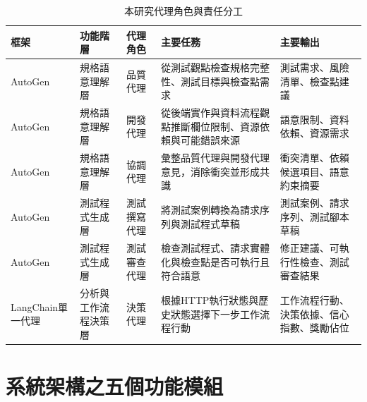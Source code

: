\begin{ZhChapter}
\begin{table}[H]
    \centering
    \caption{本研究代理角色與責任分工}
    \label{tab:agent_roles}
    \scriptsize
    \renewcommand{\arraystretch}{1.4}
    \begin{tabularx}{\textwidth}{>{\raggedright\arraybackslash}p{1.3cm} >{\raggedright\arraybackslash}p{1.8cm} >{\raggedright\arraybackslash}p{2.4cm} >{\raggedright\arraybackslash}X >{\raggedright\arraybackslash}X}
        \toprule
        \textbf{框架} & \textbf{功能階層} & \textbf{代理角色} & \textbf{主要任務} & \textbf{主要輸出} \\
        \midrule
        AutoGen & 規格語意理解層 & 品質代理 & 從測試觀點檢查規格完整性、測試目標與檢查點需求 & 測試需求、風險清單、檢查點建議 \\
        AutoGen & 規格語意理解層 & 開發代理 & 從後端實作與資料流程觀點推斷欄位限制、資源依賴與可能錯誤來源 & 語意限制、資料依賴、資源需求 \\
        AutoGen & 規格語意理解層 & 協調代理 & 彙整品質代理與開發代理意見，消除衝突並形成共識 & 衝突清單、依賴候選項目、語意約束摘要 \\
        AutoGen & 測試程式生成層 & 測試撰寫代理 & 將測試案例轉換為請求序列與測試程式草稿 & 測試案例、請求序列、測試腳本草稿 \\
        AutoGen & 測試程式生成層 & 測試審查代理 & 檢查測試程式、請求實體化與檢查點是否可執行且符合語意 & 修正建議、可執行性檢查、測試審查結果 \\
        LangChain單一代理 & 分析與工作流程決策層 & 決策代理 & 根據HTTP執行狀態與歷史狀態選擇下一步工作流程行動 & 工作流程行動、決策依據、信心指數、獎勵佔位 \\
        \bottomrule
    \end{tabularx}
\end{table}

\section{系統架構之五個功能模組}


\end{ZhChapter}
